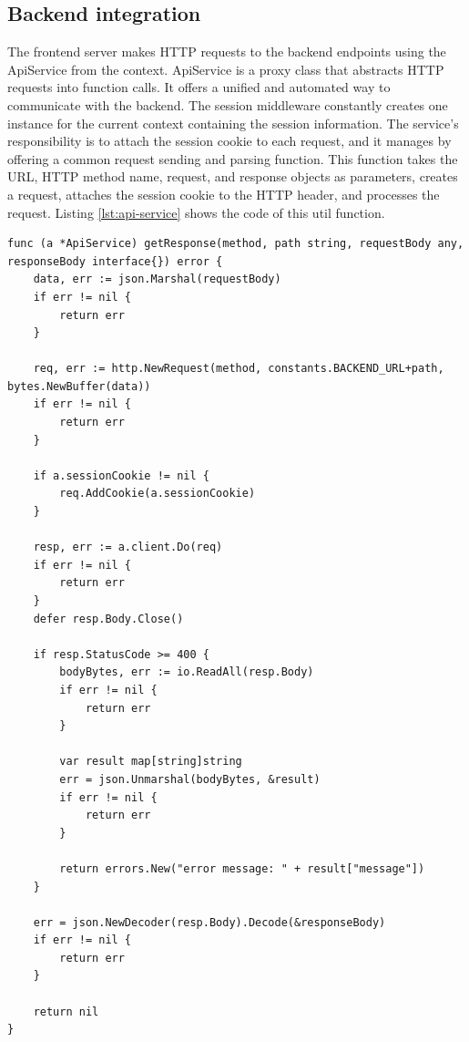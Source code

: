 \subsection{Backend integration}

The frontend server makes HTTP requests to the backend endpoints using the ApiService from the context. ApiService is a proxy class that abstracts HTTP requests into function calls. It offers a unified and automated way to communicate with the backend. The session middleware constantly creates one instance for the current context containing the session information. The service's responsibility is to attach the session cookie to each request, and it manages by offering a common request sending and parsing function. This function takes the URL, HTTP method name, request, and response objects as parameters, creates a request, attaches the session cookie to the HTTP header, and processes the request. Listing \ref{lst:api-service} shows the code of this util function.

\begin{lstlisting}[caption=ApiService code,label=lst:api-service]
func (a *ApiService) getResponse(method, path string, requestBody any, responseBody interface{}) error {
	data, err := json.Marshal(requestBody)
	if err != nil {
		return err
	}

	req, err := http.NewRequest(method, constants.BACKEND_URL+path, bytes.NewBuffer(data))
	if err != nil {
		return err
	}

	if a.sessionCookie != nil {
		req.AddCookie(a.sessionCookie)
	}

	resp, err := a.client.Do(req)
	if err != nil {
		return err
	}
	defer resp.Body.Close()

	if resp.StatusCode >= 400 {
		bodyBytes, err := io.ReadAll(resp.Body)
		if err != nil {
			return err
		}

		var result map[string]string
		err = json.Unmarshal(bodyBytes, &result)
		if err != nil {
			return err
		}

		return errors.New("error message: " + result["message"])
	}

	err = json.NewDecoder(resp.Body).Decode(&responseBody)
	if err != nil {
		return err
	}

	return nil
}
\end{lstlisting}